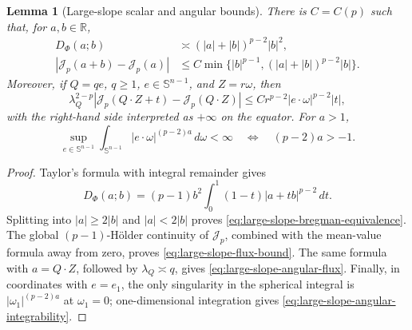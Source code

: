 \documentclass[11pt,reqno]{amsart}
\numberwithin{equation}{section}
\newcommand{\R}{\mathbb R}
\newcommand{\Jp}{\mathcal J_p}
\newcommand{\dd}{\,d}
\newtheorem{lemma}[theorem]{Lemma}
\theoremstyle{remark}
\begin{document}
\begin{lemma}[Large-slope scalar and angular bounds]
\label{lem:large-slope-scalar-angular}
There is \(C=C(p)\) such that, for \(a,b\in\R\),
\begin{align}
 D_\Phi(a;b)&\asymp (|a|+|b|)^{p-2}|b|^2,
 \label{eq:large-slope-bregman-equivalence}\\
 |\Jp(a+b)-\Jp(a)|
 &\le C\min\{|b|^{p-1},(|a|+|b|)^{p-2}|b|\}.
 \label{eq:large-slope-flux-bound}
\end{align}
Moreover, if \(Q=q e\), \(q\ge1\), \(e\in\mathbb S^{n-1}\), and
\(Z=r\omega\), then
\begin{equation}
 \lambda_Q^{2-p}
 |\Jp(Q\cdot Z+t)-\Jp(Q\cdot Z)|
 \le Cr^{p-2}|e\cdot\omega|^{p-2}|t|,
 \label{eq:large-slope-angular-flux}
\end{equation}
with the right-hand side interpreted as \(+\infty\) on the equator.
For \(a>1\),
\begin{equation}
 \sup_{e\in\mathbb S^{n-1}}
 \int_{\mathbb S^{n-1}}|e\cdot\omega|^{(p-2)a}\dd\omega<\infty
 \quad\Longleftrightarrow\quad (p-2)a>-1.
 \label{eq:large-slope-angular-integrability}
\end{equation}
\end{lemma}

\begin{proof}
Taylor's formula with integral remainder gives
\[
 D_\Phi(a;b)
 =(p-1)b^2\int_0^1(1-t)|a+tb|^{p-2}\dd t.
\]
Splitting into \(|a|\ge2|b|\) and \(|a|<2|b|\) proves
\eqref{eq:large-slope-bregman-equivalence}.  The global
\((p-1)\)-H\"older continuity of \(\Jp\), combined with the mean-value
formula away from zero, proves \eqref{eq:large-slope-flux-bound}.
The same formula with \(a=Q\cdot Z\), followed by
\(\lambda_Q\asymp q\), gives \eqref{eq:large-slope-angular-flux}.
Finally, in coordinates with \(e=e_1\), the only singularity in the
spherical integral is \(|\omega_1|^{(p-2)a}\) at \(\omega_1=0\);
one-dimensional integration gives \eqref{eq:large-slope-angular-integrability}.
\end{proof}
\end{document}
